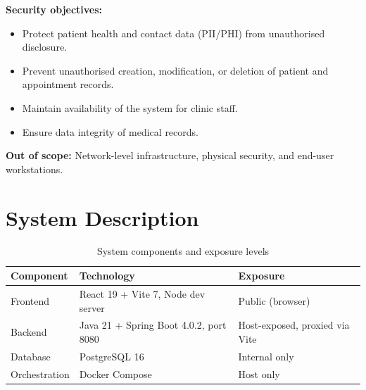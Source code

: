\documentclass[12pt,a4paper]{report}
\begin{document}
\textbf{Security objectives:}
\begin{itemize}
  \item Protect patient health and contact data (PII/PHI) from unauthorised disclosure.
  \item Prevent unauthorised creation, modification, or deletion of patient and appointment records.
  \item Maintain availability of the system for clinic staff.
  \item Ensure data integrity of medical records.
\end{itemize}

\textbf{Out of scope:} Network-level infrastructure, physical security, and end-user workstations.

\section{System Description}

\begin{table}[H]
\centering
\caption{System components and exposure levels}
\begin{tabularx}{\linewidth}{l X l}
\toprule
\textbf{Component} & \textbf{Technology} & \textbf{Exposure} \\
\midrule
Frontend      & React 19 + Vite 7, Node dev server           & Public (browser) \\
Backend       & Java 21 + Spring Boot 4.0.2, port 8080       & Host-exposed, proxied via Vite \\
Database      & PostgreSQL 16                                 & Internal only \\
Orchestration & Docker Compose                                & Host only \\
\bottomrule
\end{tabularx}
\end{table}
\end{document}
